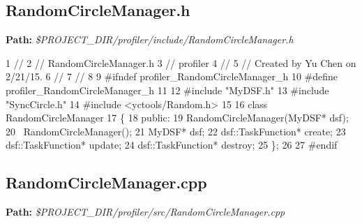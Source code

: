 \hypertarget{_benchmark_program_BenchmarkProgramRandomCircleManager_h}{}\subsection{Random\+Circle\+Manager.\+h}\label{_benchmark_program_BenchmarkProgramRandomCircleManager_h}
{\bfseries Path\+:} {\itshape \$\+P\+R\+O\+J\+E\+C\+T\+\_\+\+D\+I\+R/profiler/include/\+Random\+Circle\+Manager.h} 
\begin{DoxyCodeInclude}
1 \textcolor{comment}{//}
2 \textcolor{comment}{//  RandomCircleManager.h}
3 \textcolor{comment}{//  profiler}
4 \textcolor{comment}{//}
5 \textcolor{comment}{//  Created by Yu Chen on 2/21/15.}
6 \textcolor{comment}{//}
7 \textcolor{comment}{//}
8 
9 \textcolor{preprocessor}{#ifndef profiler\_RandomCircleManager\_h}
10 \textcolor{preprocessor}{#define profiler\_RandomCircleManager\_h}
11 
12 \textcolor{preprocessor}{#include "MyDSF.h"}
13 \textcolor{preprocessor}{#include "SyncCircle.h"}
14 \textcolor{preprocessor}{#include <yctools/Random.h>}
15 
16 \textcolor{keyword}{class }RandomCircleManager
17 \{
18 \textcolor{keyword}{public}:
19     RandomCircleManager(MyDSF* dsf);
20     ~RandomCircleManager();
21     MyDSF* dsf;
22     dsf::TaskFunction* create;
23     dsf::TaskFunction* update;
24     dsf::TaskFunction* destroy;
25 \};
26 
27 \textcolor{preprocessor}{#endif}
\end{DoxyCodeInclude}
 \hypertarget{_benchmark_program_BenchmarkProgramRandomCircleManager_cpp}{}\subsection{Random\+Circle\+Manager.\+cpp}\label{_benchmark_program_BenchmarkProgramRandomCircleManager_cpp}
{\bfseries Path\+:} {\itshape \$\+P\+R\+O\+J\+E\+C\+T\+\_\+\+D\+I\+R/profiler/src/\+Random\+Circle\+Manager.cpp} 

